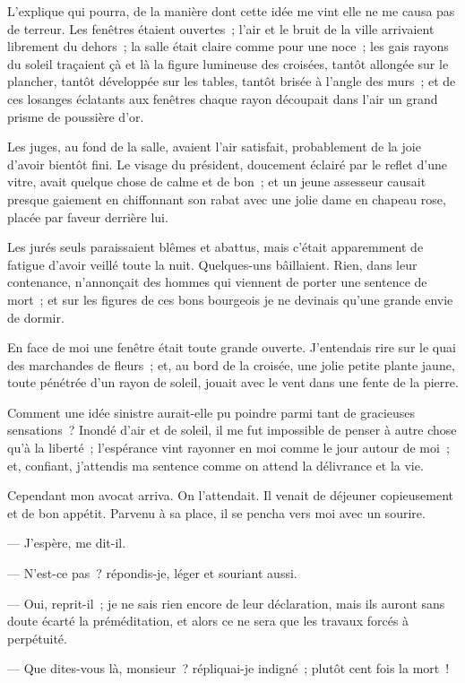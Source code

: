 \documentclass[french,twoside]{book} %
\begin{document}
L’explique qui pourra, de la manière dont cette idée me vint elle ne me causa pas de terreur. Les fenêtres étaient ouvertes ; l’air et le bruit de la ville arrivaient librement du dehors ; la salle était claire comme pour une noce ; les gais rayons du soleil traçaient çà et là la figure lumineuse des croisées, tantôt allongée sur le plancher, tantôt développée sur les tables, tantôt brisée à l’angle des murs ; et de ces losanges éclatants aux fenêtres chaque rayon découpait dans l’air un grand prisme de poussière d’or.\par
Les juges, au fond de la salle, avaient l’air satisfait, probablement de la joie d’avoir bientôt fini. Le visage du président, doucement éclairé par le reflet d’une vitre, avait quelque chose de calme et de bon ; et un jeune assesseur causait presque gaiement en chiffonnant son rabat avec une jolie dame en chapeau rose, placée par faveur derrière lui.\par
Les jurés seuls paraissaient blêmes et abattus, mais c’était apparemment de fatigue d’avoir veillé toute la nuit. Quelques-uns bâillaient. Rien, dans leur contenance, n’annonçait des hommes qui viennent de porter une sentence de mort ; et sur les figures de ces bons  bourgeois je ne devinais qu’une grande envie de dormir.\par
En face de moi une fenêtre était toute grande ouverte. J’entendais rire sur le quai des marchandes de fleurs ; et, au bord de la croisée, une jolie petite plante jaune, toute pénétrée d’un rayon de soleil, jouait avec le vent dans une fente de la pierre.\par
Comment une idée sinistre aurait-elle pu poindre parmi tant de gracieuses sensations ? Inondé d’air et de soleil, il me fut impossible de penser à autre chose qu’à la liberté ; l’espérance vint rayonner en moi comme le jour autour de moi ; et, confiant, j’attendis ma sentence comme on attend la délivrance et la vie.\par
Cependant mon avocat arriva. On l’attendait. Il venait de déjeuner copieusement et de bon appétit. Parvenu à sa place, il se pencha vers moi avec un sourire.\par
— J’espère, me dit-il.\par
— N’est-ce pas ? répondis-je, léger et souriant aussi.\par
— Oui, reprit-il ; je ne sais rien encore de leur déclaration, mais ils auront sans doute écarté la préméditation, et alors ce ne sera que les travaux forcés à perpétuité.\par
— Que dites-vous là, monsieur ? répliquai-je indigné ; plutôt cent fois la mort !\par
\end{document}
